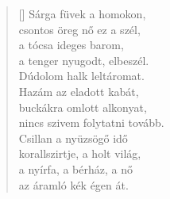 \documentclass[14pt]{article}
\begin{document}

\LARGE
\zapfino



\settowidth{\versewidth}{nincs szivem folytatni tovább.}

\begin{center}
\begin{verse}[\versewidth]
  Sárga füvek a homokon, \\[-5mm]
  csontos öreg nő ez a szél, \\[-6mm]
  a tócsa ideges barom, \\[-4mm]
  a tenger nyugodt, elbeszél. \\[1.5\baselineskip]

  Dúdolom halk leltáromat. \\[1mm]
  Hazám az eladott kabát, \\[1mm]
  buckákra omlott alkonyat, \\[-5mm]
  nincs szivem folytatni tovább. \\[1\baselineskip]

  Csillan a nyüzsögő idő \\[-6mm]
  korallszirtje, a holt világ, \\[-6mm]
  a nyírfa, a bérház, a nő \\[-5mm]
  az áramló kék égen át.
\end{verse}
\end{center}
\end{document}
